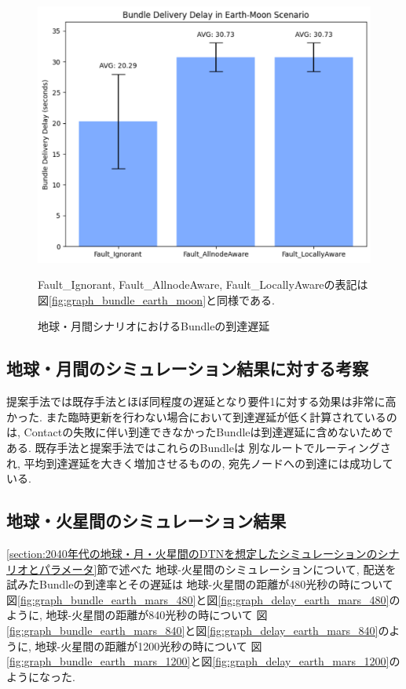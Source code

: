 \begin{figure}[tbh]
    \centering
    \includegraphics[width=0.7\textheight]{img/moon_delay.pdf}
    \caption{地球・月間シナリオにおけるBundleの到達遅延}
    \label{fig:graph_delay_earth_moon}
    \begin{minipage}{\textwidth}
        \centering
        \vspace{3mm}
        \fontsize{10.5pt}{12pt}\selectfont
        Fault\_Ignorant, Fault\_AllnodeAware, Fault\_LocallyAwareの表記は
        図\ref{fig:graph_bundle_earth_moon}と同様である.
    \end{minipage}
\end{figure}

\subsection{地球・月間のシミュレーション結果に対する考察}
\label{section:地球・月間のシミュレーション結果に対する考察}
提案手法では既存手法とほぼ同程度の遅延となり要件1に対する効果は非常に高かった. 
また臨時更新を行わない場合において到達遅延が低く計算されているのは, 
Contactの失敗に伴い到達できなかったBundleは到達遅延に含めないためである. 既存手法と提案手法ではこれらのBundleは
別なルートでルーティングされ, 平均到達遅延を大きく増加させるものの, 宛先ノードへの到達には成功している. 

\subsection{地球・火星間のシミュレーション結果}
\label{section:地球・火星間のシミュレーション結果}
\ref{section:2040年代の地球・月・火星間のDTNを想定したシミュレーションのシナリオとパラメータ}節で述べた
地球-火星間のシミュレーションについて, 配送を試みたBundleの到達率とその遅延は
地球-火星間の距離が480光秒の時について
図\ref{fig:graph_bundle_earth_mars_480}と図\ref{fig:graph_delay_earth_mars_480}のように, 
地球-火星間の距離が840光秒の時について
図\ref{fig:graph_bundle_earth_mars_840}と図\ref{fig:graph_delay_earth_mars_840}のように, 
地球-火星間の距離が1200光秒の時について
図\ref{fig:graph_bundle_earth_mars_1200}と図\ref{fig:graph_delay_earth_mars_1200}のようになった. 

